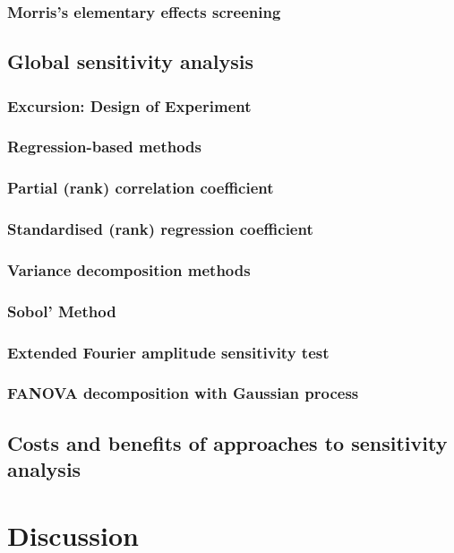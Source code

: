 \subsubsection{Morris's elementary effects screening}
\label{thiele:sensitivity:screening:morris}

\subsection{Global sensitivity analysis}
\label{thiele:sensitivity:global}

\subsubsection{Excursion: Design of Experiment}
\label{thiele:sensitivity:global:excursion}

\subsubsection{Regression-based methods}
\label{thiele:sensitivity:global:regression}

\subsubsection{Partial (rank) correlation coefficient}
\label{thiele:sensitivity:global:partial}

\subsubsection{Standardised (rank) regression coefficient}
\label{thiele:sensitivity:global:standardised}

\subsubsection{Variance decomposition methods}
\label{thiele:sensitivity:global:variance}

\subsubsection{Sobol' Method}
\label{thiele:sensitivity:sobol}

\subsubsection{Extended Fourier amplitude sensitivity test}
\label{thiele:sensitivity:sobol:fourier}

\subsubsection{FANOVA decomposition with Gaussian process}
\label{thiele:sensitivity:sobol:fanova}

\subsection{Costs and benefits of approaches to sensitivity analysis}
\label{thiele:sensitivity:sobol:costs_and_benefits}

\section{Discussion}
\label{thiele:discussion}
